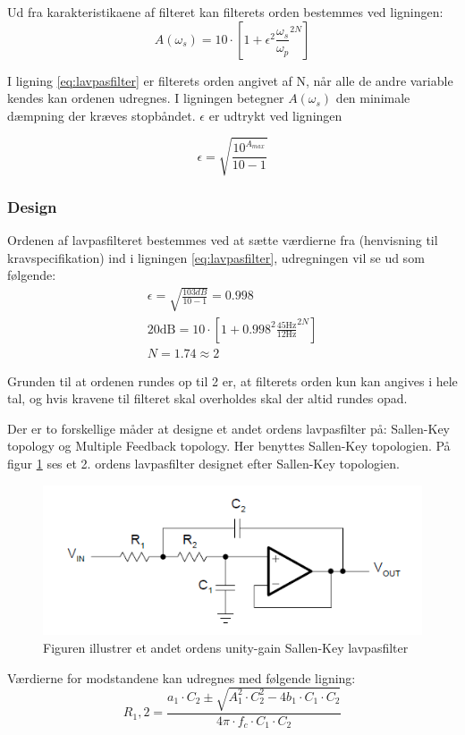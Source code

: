 Ud fra karakteristikaene af filteret kan filterets orden bestemmes ved ligningen: 
\begin{equation} \label{eq:lavpasfilter}
A(\omega_s) = 10 \cdot \left[1 + \epsilon^2 \frac{\omega _s}{\omega _p}^{2N}\right] 
\end{equation}

I ligning \ref{eq:lavpasfilter} er filterets orden angivet af N, når alle de andre variable kendes kan ordenen udregnes. I ligningen betegner $A(\omega _s)$ den minimale dæmpning der kræves stopbåndet. $\epsilon$ er udtrykt ved ligningen
\begin{center}
\begin{equation}
\epsilon = \sqrt{\frac{10^{A_{max}}}{10 - 1}}
\end{equation}
\end{center}

\subsubsection{Design}
Ordenen af lavpasfilteret bestemmes ved at sætte værdierne fra (henvisning til kravspecifikation) ind i ligningen \ref{eq:lavpasfilter}, udregningen vil se ud som følgende:
\begin{align}
\epsilon = \sqrt{\frac{103dB}{10 - 1}} = 0.998 \\
20\text{dB} = 10 \cdot \left[1 + 0.998^2 \frac{45\text{Hz}}{12\text{Hz}}^{2N}\right] \\
N = 1.74 \approx 2
\end{align}

Grunden til at ordenen rundes op til 2 er, at filterets orden kun kan angives i hele tal, og hvis kravene til filteret skal overholdes skal der altid rundes opad. 

Der er to forskellige måder at designe et andet ordens lavpasfilter på: Sallen-Key topology og Multiple Feedback topology. Her benyttes Sallen-Key topologien. På figur \ref{fig:SallenKey} ses et 2. ordens lavpasfilter designet efter Sallen-Key topologien.
\begin{figure}[H]
\includegraphics[scale=1]{figures/cProblemloesning/SallenLavpas.PNG}
\caption{Figuren illustrer et andet ordens unity-gain Sallen-Key lavpasfilter}
\label{fig:SallenKey}
\end{figure}
Værdierne for modstandene kan udregnes med følgende ligning:
\begin{equation} \label{eq:LavpasModstande}
R_1,2 = \frac{a_1 \cdot C_2 \pm \sqrt{A_1^2 \cdot C_2^2 - 4b_1 \cdot C_1 \cdot C_2}}{4 \pi \cdot f_c \cdot C_1 \cdot C_2}
\end{equation}

